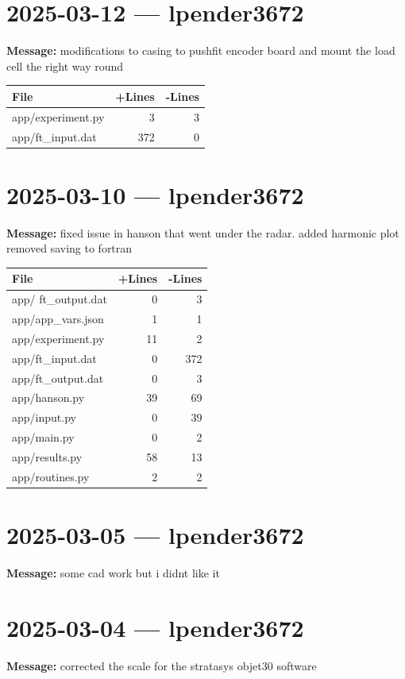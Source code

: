 \documentclass{article}
\begin{document}
\section*{2025-03-12 --- lpender3672}
\textbf{Message:} modifications to casing to pushfit encoder board and mount the load cell the right way round

\begin{longtable}{|p{10cm}|r|r|}
\hline \textbf{File} & \textbf{+Lines} & \textbf{-Lines} \\
\hline
app/experiment.py & 3 & 3 \\
\hline
app/ft\_input.dat & 372 & 0 \\
\hline
\end{longtable}

\section*{2025-03-10 --- lpender3672}
\textbf{Message:} fixed issue in hanson that went under the radar. added harmonic plot removed saving to fortran

\begin{longtable}{|p{10cm}|r|r|}
\hline \textbf{File} & \textbf{+Lines} & \textbf{-Lines} \\
\hline
app/ ft\_output.dat & 0 & 3 \\
\hline
app/app\_vars.json & 1 & 1 \\
\hline
app/experiment.py & 11 & 2 \\
\hline
app/ft\_input.dat & 0 & 372 \\
\hline
app/ft\_output.dat & 0 & 3 \\
\hline
app/hanson.py & 39 & 69 \\
\hline
app/input.py & 0 & 39 \\
\hline
app/main.py & 0 & 2 \\
\hline
app/results.py & 58 & 13 \\
\hline
app/routines.py & 2 & 2 \\
\hline
\end{longtable}

\section*{2025-03-05 --- lpender3672}
\textbf{Message:} some cad work but i didnt like it

\section*{2025-03-04 --- lpender3672}
\textbf{Message:} corrected the scale for the stratasys objet30 software
\end{document}
